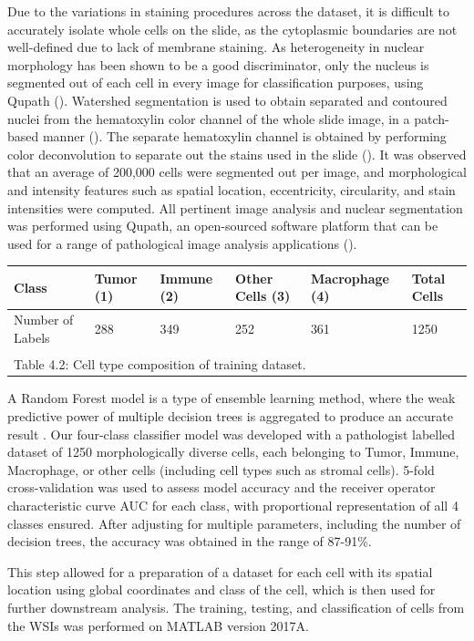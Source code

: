\documentclass[
]{book}
\begin{document}
Due to the variations in staining procedures across the dataset, it is difficult to accurately isolate whole cells on the slide, as the cytoplasmic boundaries are not well-defined due to lack of membrane staining. As heterogeneity in nuclear morphology has been shown to be a good discriminator, only the nucleus is segmented out of each cell in every image for classification purposes, using Qupath (\citet{Yuan12}). Watershed segmentation is used to obtain separated and contoured nuclei from the hematoxylin color channel of the whole slide image, in a patch-based manner (\citet{Bankhead18}). The separate hematoxylin channel is obtained by performing color deconvolution to separate out the stains used in the slide (\citet{Ruifrok01}). It was observed that an average of 200,000 cells were segmented out per image, and morphological and intensity features such as spatial location, eccentricity, circularity, and stain intensities were computed. All pertinent image analysis and nuclear segmentation was performed using Qupath, an open-sourced software platform that can be used for a range of pathological image analysis applications (\citet{Bankhead17}).

\begin{tabular}{l|l|l|l|l|l}
\hline
Class & Tumor (1) & Immune (2) & Other Cells (3) & Macrophage (4) & Total Cells\\
\hline
Number of Labels & 288 & 349 & 252 & 361 & 1250\\
\hline
\multicolumn{6}{l}{\textsuperscript{} Table 4.2: Cell type composition of training dataset.}\\
\end{tabular}

A Random Forest model is a type of ensemble learning method, where the weak predictive power of multiple decision trees is aggregated to produce an accurate result \citet{Breiman01}. Our four-class classifier model was developed with a pathologist labelled dataset of 1250 morphologically diverse cells, each belonging to Tumor, Immune, Macrophage, or other cells (including cell types such as stromal cells). 5-fold cross-validation was used to assess model accuracy and the receiver operator characteristic curve AUC for each class, with proportional representation of all 4 classes ensured. After adjusting for multiple parameters, including the number of decision trees, the accuracy was obtained in the range of 87-91\%.

This step allowed for a preparation of a dataset for each cell with its spatial location using global coordinates and class of the cell, which is then used for further downstream analysis. The training, testing, and classification of cells from the WSIs was performed on MATLAB version 2017A.
\end{document}
